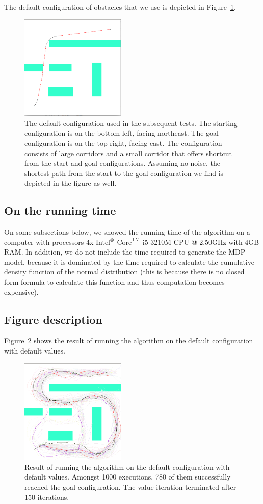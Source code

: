 \documentclass[10pt,a4paper,oneside]{article}
\begin{document}
The default configuration of obstacles that we use is depicted in
Figure~\ref{fig:b_shortest}.

\begin{figure}
\centerline{\includegraphics[width=5cm]{figures/b_shortest.png}}
\caption{The default configuration used in the subsequent tests. The starting
  configuration is on the bottom left, facing northeast. The goal configuration
  is on the top right, facing east. The configuration consists
  of large corridors and a small corridor that offers shortcut from the start
  and goal configurations. Assuming no noise, the shortest path from the start
to the goal configuration we find is depicted in the figure as well.}
\label{fig:b_shortest}
\end{figure}

\subsection{On the running time}
On some subsections below, we showed the running time of the algorithm on
a computer with processors 4x Intel$^\text{\textregistered}$ $\text{Core}^{\text{TM}}$ i5-3210M CPU @ 2.50GHz with 4GB RAM. In addition, we do not
include the time required to generate the MDP model, because it is dominated
by the time required to calculate the cumulative density function of the
normal distribution (this is because there is no closed form formula to
calculate this function and thus computation becomes expensive).

\subsection{Figure description}
Figure~\ref{fig:b} shows the result of running the algorithm on the default
configuration with default values.

\begin{figure}
\centerline{\includegraphics[width=5cm]{figures/b.png}}
\caption{Result of running the algorithm on the default configuration with default values.
Amongst 1000 executions, 780 of them successfully reached the goal configuration.
The value iteration terminated after 150 iterations.}
\label{fig:b}
\end{figure}
\end{document}
